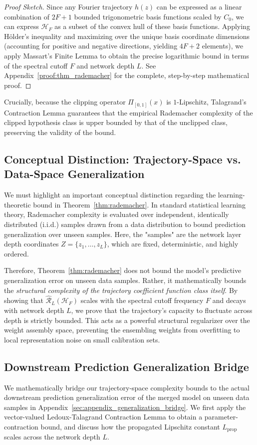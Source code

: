 \begin{proof}[Proof Sketch]
Since any Fourier trajectory $h(z)$ can be expressed as a linear combination of $2F+1$ bounded trigonometric basis functions scaled by $C_0$, we can express $\mathcal{H}_F$ as a subset of the convex hull of these basis functions. Applying H{\"o}lder's inequality and maximizing over the unique basis coordinate dimensions (accounting for positive and negative directions, yielding $4F+2$ elements), we apply Massart's Finite Lemma to obtain the precise logarithmic bound in terms of the spectral cutoff $F$ and network depth $L$. See Appendix~\ref{proof:thm_rademacher} for the complete, step-by-step mathematical proof.
\end{proof}

Crucially, because the clipping operator $\Pi_{[0,1]}(x)$ is $1$-Lipschitz, Talagrand's Contraction Lemma guarantees that the empirical Rademacher complexity of the clipped hypothesis class is upper bounded by that of the unclipped class, preserving the validity of the bound.

\subsection{Conceptual Distinction: Trajectory-Space vs. Data-Space Generalization}
We must highlight an important conceptual distinction regarding the learning-theoretic bound in Theorem~\ref{thm:rademacher}. In standard statistical learning theory, Rademacher complexity is evaluated over independent, identically distributed (i.i.d.) samples drawn from a data distribution to bound prediction generalization over unseen samples. Here, the "samples" are the network layer depth coordinates $Z = \{z_1, \dots, z_L\}$, which are fixed, deterministic, and highly ordered. 

Therefore, Theorem~\ref{thm:rademacher} does not bound the model's predictive generalization error on unseen data samples. Rather, it mathematically bounds the \emph{structural complexity of the trajectory coefficient function class itself}. By showing that $\widehat{\mathcal{R}}_L(\mathcal{H}_F)$ scales with the spectral cutoff frequency $F$ and decays with network depth $L$, we prove that the trajectory's capacity to fluctuate across depth is strictly bounded. This acts as a powerful structural regularizer over the weight assembly space, preventing the ensembling weights from overfitting to local representation noise on small calibration sets.

\subsection{Downstream Prediction Generalization Bridge}
We mathematically bridge our trajectory-space complexity bounds to the actual downstream prediction generalization error of the merged model on unseen data samples in Appendix~\ref{sec:appendix_generalization_bridge}. We first apply the vector-valued Ledoux-Talagrand Contraction Lemma to obtain a parameter-contraction bound, and discuss how the propagated Lipschitz constant $L_{\text{prop}}$ scales across the network depth $L$. 

